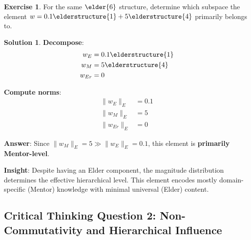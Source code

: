 \documentclass[12pt,a4paper]{article}
\theoremstyle{definition}
\newtheorem{exercise}{Exercise}[section]
\newtheorem{solution}{Solution}[section]
\theoremstyle{remark}
\begin{document}
\begin{exercise}
For the same $\elder{6}$ structure, determine which subspace the element $w = 0.1\elderstructure{1} + 5\elderstructure{4}$ primarily belongs to.
\end{exercise}

\begin{solution}
\textbf{Decompose}:
\begin{align}
w_E &= 0.1\elderstructure{1} \\
w_M &= 5\elderstructure{4} \\
w_{Er} &= 0
\end{align}

\textbf{Compute norms}:
\begin{align}
\|w_E\|_E &= 0.1 \\
\|w_M\|_E &= 5 \\
\|w_{Er}\|_E &= 0
\end{align}

\textbf{Answer}: Since $\|w_M\|_E = 5 \gg \|w_E\|_E = 0.1$, this element is \textbf{primarily Mentor-level}.

\textbf{Insight}: Despite having an Elder component, the magnitude distribution determines the effective hierarchical level. This element encodes mostly domain-specific (Mentor) knowledge with minimal universal (Elder) content.
\end{solution}

\newpage
\subsection{Critical Thinking Question 2: Non-Commutativity and Hierarchical Influence}
\end{document}
